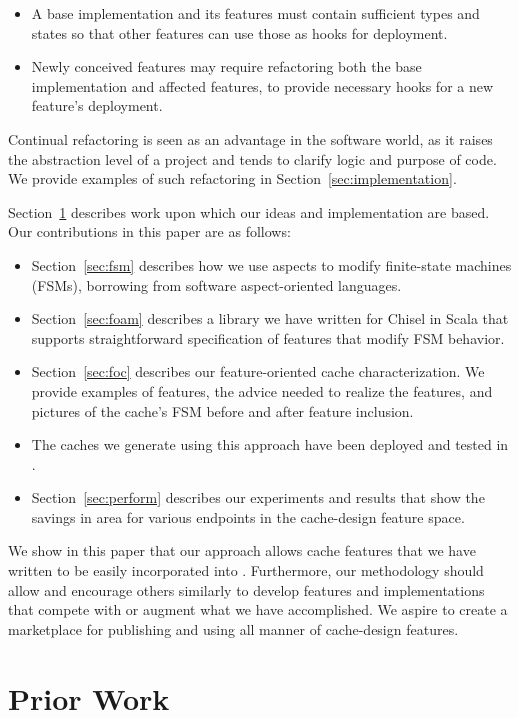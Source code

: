 \documentclass[conference]{IEEEtran}
\begin{document}
\begin{itemize}
    \item A base implementation and its features must contain sufficient types and states so that other features can use those as hooks for deployment.
    \item Newly conceived features may require refactoring both the base implementation and affected features, to provide necessary hooks for a new feature's deployment.
\end{itemize}
Continual refactoring is seen as an advantage in the software world, as it raises the abstraction level of a project and tends to clarify logic and purpose of code. We provide examples of such refactoring in Section~\ref{sec:implementation}.

Section~\ref{sec:prior} describes work upon which our ideas and implementation are based.   Our contributions in this paper are as follows:
\begin{itemize}
    \item Section~\ref{sec:fsm} describes how we use aspects to modify finite-state machines (FSMs), borrowing from software aspect-oriented languages.
    \item Section~\ref{sec:foam} describes a library we have written for Chisel in Scala that supports straightforward specification of features that modify FSM behavior.
    \item Section~\ref{sec:foc} describes our feature-oriented cache characterization.  We provide examples of features, the advice needed to realize the features, and pictures of the cache's FSM before and after feature inclusion.
    \item The caches we generate using this approach have been deployed and tested in \Riscvmini{}.
    \item Section~\ref{sec:perform} describes our experiments and results that show the savings in area for various endpoints in the cache-design feature space. 
\end{itemize}
We show in this paper that our approach allows cache features that we have written to be easily incorporated into \Riscvmini{}.  Furthermore, our methodology should allow and encourage others similarly to develop features and implementations that compete with or augment what we have accomplished.  We aspire to create a marketplace for publishing and using all manner of cache-design features.

\section{Prior Work}\label{sec:prior}
\end{document}
